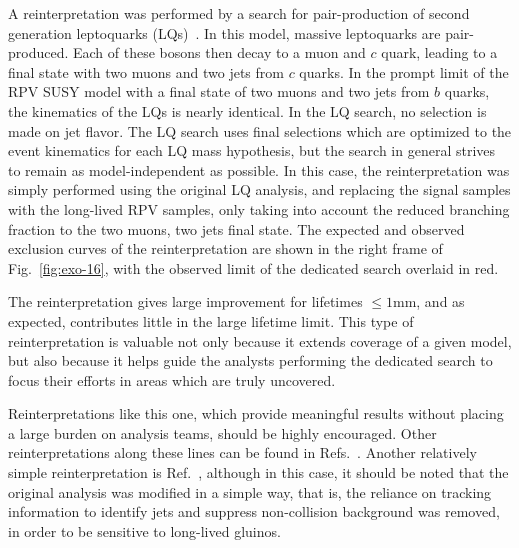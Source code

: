 A reinterpretation was performed by a search for pair-production of second
generation leptoquarks (LQs)~\cite{CMS-PAS-EXO-16-007}. In this model, massive
leptoquarks are pair-produced.  Each of these bosons then decay to a muon and
$c$ quark, leading to a final state with two muons and two jets from $c$ quarks.
In the prompt limit of the RPV SUSY model with a final state of two muons and
two jets from $b$ quarks, the kinematics of the LQs is nearly identical. In the
LQ search, no selection is made on jet flavor. The LQ search uses final
selections which are optimized to the event kinematics for each LQ mass
hypothesis, but the search in general strives to remain as model-independent as
possible. In this case, the reinterpretation was simply performed using the
original LQ analysis, and replacing the signal samples with the long-lived RPV
samples, only taking into account the reduced branching fraction to the two
muons, two jets final state. The expected and observed exclusion curves of the
reinterpretation are shown in the right frame of Fig.~\ref{fig:exo-16}, with
the observed limit of the dedicated search overlaid in red.

The reinterpretation gives large improvement for lifetimes $\leq1$mm, and as
expected, contributes little in the large lifetime limit. This type of
reinterpretation is valuable not only because it extends coverage of a given
model, but also because it helps guide the analysts performing the dedicated
search to focus their efforts in areas which are truly uncovered.

Reinterpretations like this one, which provide meaningful results without
placing a large burden on analysis teams, should be highly encouraged. Other reinterpretations along
these lines can be found in Refs.~\cite{ATLAS-CONF-2014-037,Sirunyan:2018vjp}. Another relatively simple
reinterpretation is Ref.~\cite{ATLAS-CONF-2018-003}, although in this case, it
should be noted that the original analysis was modified in a simple way, that is,
the reliance on tracking information to identify jets and suppress non-collision background was
removed, in order to be sensitive to long-lived gluinos.

